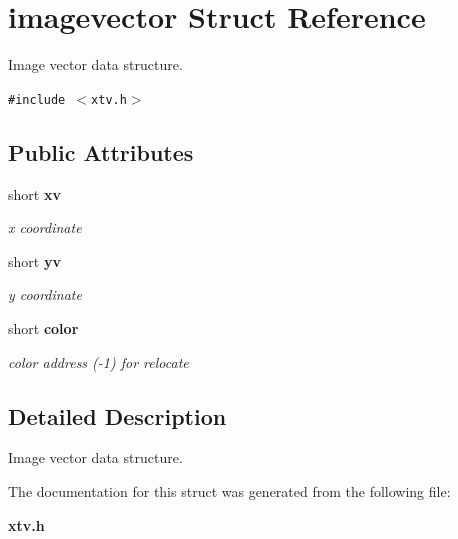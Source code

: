 \section{imagevector Struct Reference}
\label{structimagevector}
Image vector data structure.  


{\tt \#include $<$xtv.h$>$}

\subsection*{Public Attributes}
\begin{CompactItemize}
\item 
short {\bf xv}\label{structimagevector_o0}

\begin{CompactList}\small\item\em x coordinate \item\end{CompactList}\item 
short {\bf yv}\label{structimagevector_o1}

\begin{CompactList}\small\item\em y coordinate \item\end{CompactList}\item 
short {\bf color}\label{structimagevector_o2}

\begin{CompactList}\small\item\em color address (-1) for relocate \item\end{CompactList}\end{CompactItemize}


\subsection{Detailed Description}
Image vector data structure. 



The documentation for this struct was generated from the following file:\begin{CompactItemize}
\item 
{\bf xtv.h}\end{CompactItemize}
